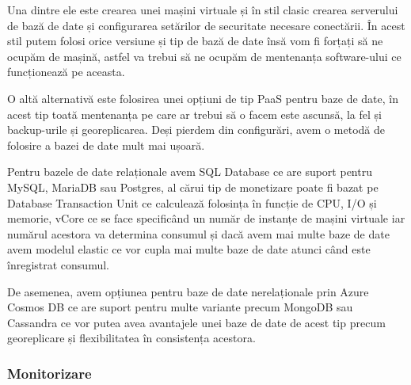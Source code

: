 Una dintre ele este crearea unei mașini virtuale și în stil clasic crearea serverului
de bază de date și configurarea setărilor de securitate necesare conectării. În acest 
stil putem folosi orice versiune și tip de bază de date însă vom fi forțați să 
ne ocupăm de mașină, astfel va trebui să ne ocupăm de mentenanța software-ului ce
funcționează pe aceasta.

O altă alternativă este folosirea unei opțiuni de tip PaaS pentru baze de date, în 
acest tip toată mentenanța pe care ar trebui să o facem este ascunsă, la fel și 
backup-urile și georeplicarea. Deși pierdem din configurări, avem o metodă de 
folosire a bazei de date mult mai ușoară.

Pentru bazele de date relaționale avem SQL Database ce are suport pentru MySQL, MariaDB
sau Postgres, al cărui tip de monetizare poate fi bazat pe Database Transaction Unit
ce calculează folosința în funcție de CPU, I/O și memorie, vCore ce se face specificând 
un număr de instanțe de mașini virtuale iar numărul acestora va determina consumul și dacă
avem mai multe baze de date avem modelul elastic ce vor cupla mai multe baze de date atunci 
când este înregistrat consumul.

De asemenea, avem opțiunea pentru baze de date nerelaționale prin Azure Cosmos DB
ce are suport pentru multe variante precum MongoDB sau Cassandra ce vor putea avea 
avantajele unei baze de date de acest tip precum georeplicare și flexibilitatea în consistența acestora.

\subsubsection{Monitorizare}

